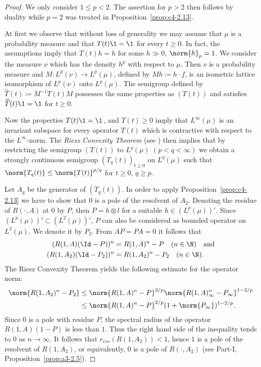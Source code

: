\begin{proof}
We only consider $1 \leq p < 2$.
The assertion for $p > 2$ then follows by duality while $p = 2$ was treated in Proposition~\ref{prop:c4-2.13}.

At first we observe that without loss of generality we may assume that $\mu$ is a probability measure and that $T(t)\1 = \1$ for every $t \geq 0$.
In fact, the assumptions imply that $T(t)h = h$ for some $h \gg 0$, $\norm{h}_{p} = 1$.
We consider the measure $\nu$ which has the density $h^{p}$ with respect to $\mu$.
Then $\nu$ is a probability measure and 
$M \colon L^{p}(\nu) \to L^{p}(\mu)$, defined by $Mh \coloneqq h\cdot f$, is an isometric lattice isomorphism of\/ $L^{p}(\nu)$ onto $L^{p}(\mu)$.
The semigroup defined by $\widehat{T}(t) \coloneqq M^{-1}T(t)M$ possesses the same properties as $(T(t))$ and satisfies $\widehat{T}(t)\1 = \1$ for $t \geq 0$.

Now the properties $T(t)\1 = \1$, and $T(t) \geq 0$ imply that $L^{\infty}(\mu)$ is an invariant subspace for every operator $T(t)$ which is contractive with respect to the $L^{\infty}$-norm.
The \emph{Riesz Convexity Theorem} (see \textcite[VI.10.11]{dunfordschwartz:1958}) then implies that by restricting the semigroup $(T(t))$ to $L^{q}(\mu)$ $(p < q < \infty)$ we obtain a strongly continuous semigroup $(T_{q}(t))_{t \geq 0}$ on $L^{q}(\mu)$ such that $\norm{T_{q}(t)} \leq \norm{T(t)}^{p/q}$ for $t \geq 0$, $q \geq p$.

Let $A_{q}$ be the generator of\/ $(T_{q}(t))$.
In order to apply Proposition~\ref{prop:c4-2.13} we have to show that $0$ is a pole of the resolvent of\/ $A_{2}$.
Denoting the residue of\/ $R(\cdot,A)$ at $0$ by $P$, then $P = h \otimes l$ for a suitable $h \in (L^{p}(\mu))'$.
Since $(L^{p}(\mu))' \subset (L^{2}(\mu))'$, $P$ can also be considered as bounded operator on $L^{2}(\mu)$.
We denote it by $P_{2}$.
From $AP = PA = 0$ it follows that
\begin{align*}
(R(1,A)(\Id-P))^{n} &= R(1,A)^{n} - P \quad (n \in \N) \quad \text{and} \\
(R(1,A_{2})(\Id-P_{2}))^{n} &= R(1,A_{2})^{n} - P_{2} \quad (n \in \N).
\end{align*}
The Riesz Convexity Theorem yields the following estimate for the operator norm:
\begin{align*}
\norm{R(1,A_{2})^{n} - P_{2}} &\leq \norm{R(1,A)^{n} - P}^{2/p}\norm{R(1,A)_{\infty}^{n} - P_{\infty}}^{1-2/p} \\
&\leq \norm{R(1,A)^{n} - P}^{2/p}(1 + \norm{P_{\infty}})^{1-2/p}.
\end{align*}
Since $0$ is a pole with residue $P$, the spectral radius of the operator $R(1,A)(1-P)$ is less than $1$.
Thus the right hand side of the inequality tends to $0$ as $n \to \infty$.
It follows that $r_{ess}(R(1,A_{2})) < 1$, hence $1$ is a pole of the resolvent of\/ $R(1,A_{2})$, or equivalently, $0$ is a pole of\/ $R(\cdot,A_{2})$ (see 
Part-I, Proposition~\ref{prop:a3-2.5}).


\end{proof}
